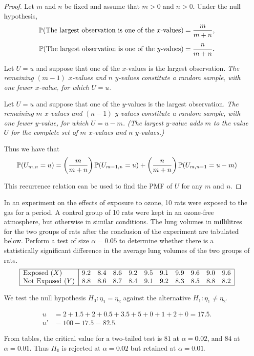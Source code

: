 \begin{proof}
Let $m$ and $n$ be fixed and assume that $m>0$ and $n>0$. Under the null hypothesis,
\begin{align*}
\mathbb{P}(\text{The largest observation is one of the $x$-values}) & = \frac{m}{m+n}, \\[1ex]
\mathbb{P}(\text{The largest observation is one of the $y$-values}) & = \frac{n}{m+n}.
\end{align*}

Let $U=u$ and suppose that one of the $x$-values is the largest observation.
\bit
\it The remaining $(m - 1)$ $x$-values and $n$ $y$-values constitute a random sample, with one fewer $x$-value, for which $U=u$.
\eit

Let $U=u$ and suppose that one of the $y$-values is the largest observation.
\bit
\it The remaining $m$ $x$-values and $(n - 1)$ $y$-values constitute a random sample, with one fewer $y$-value, for which $U=u-m$. (The largest $y$-value adds $m$ to the value $U$ for the complete set of $m$ $x$-values and $n$ $y$-values.)
\eit

Thus we have that
\[
\mathbb{P}(U_{m,n}=u) = \left(\frac{m}{m+n}\right)\mathbb{P}(U_{m-1,n}=u) + \left(\frac{n}{m+n}\right)\mathbb{P}(U_{m,n-1}=u-m)
\]

This recurrence relation can be used to find the PMF of $U$ for any $m$ and $n$.
\end{proof}

\begin{example}
In an experiment on the effects of exposure to ozone, 10 rats were exposed to the gas for a period. A control group of 10 rats were kept in an ozone-free atmosphere, but otherwise in similar conditions. The lung volumes in millilitres for the two groups of rats after the conclusion of the experiment are tabulated below. Perform a test of size $\alpha=0.05$ to determine whether there is a statistically significant difference in the average lung volumes of the two groups of rats. 
\[\begin{array}{|l|cccccccccc|} \hline
\text{Exposed } (X)		& 9.2    & 8.4    & 8.6    & 9.2    & 9.5    & 9.1    & 9.9    & 9.6    & 9.0    & 9.6 \\
\text{Not Exposed } (Y)	& 8.8    & 8.6    & 8.7    & 8.4    & 9.1    & 9.2    & 8.3    & 8.5    & 8.8    & 8.2 \\ \hline
\end{array}\]
\end{example}

\begin{solution}
We test the null hypothesis $H_0:\eta_1=\eta_2$ against the alternative $H_1:\eta_1\neq\eta_2$.

\begin{align*}
u  & = 2 + 1.5 + 2 + 0.5 + 3.5 + 5 + 0 + 1 + 2 + 0 = 17.5. \\
u' & = 100-17.5 = 82.5.
\end{align*}

From tables, the critical value for a two-tailed test is $81$ at $\alpha=0.02$, and $84$ at $\alpha=0.01$. Thus $H_0$ is rejected at $\alpha=0.02$ but retained at $\alpha=0.01$.
\end{solution}

